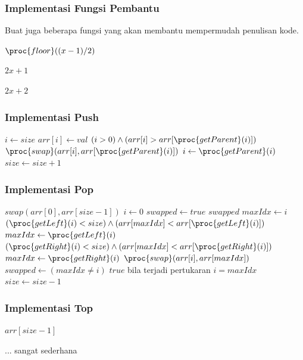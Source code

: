 \begin{frame}
\frametitle{Implementasi Fungsi Pembantu}
Buat juga beberapa fungsi yang akan membantu mempermudah penulisan kode.
\begin{codebox}
\li \Return $\proc{floor}((x-1) / 2)$
\end{codebox}

\begin{codebox}
\li \Return $2x + 1$
\end{codebox}

\begin{codebox}
\li \Return $2x + 2$
\end{codebox}
\end{frame}

\begin{frame}
\frametitle{Implementasi Push}
\begin{codebox}
\li $i \gets size$
\li $arr[i] \gets val$
\li \While $(i > 0) \land (arr[i] > arr[\proc{getParent}(i)])$  \Do
\li   $\proc{swap}(arr[i], arr[\proc{getParent}(i)])$
\li   $i \gets \proc{getParent}(i)$
    \End
\li $size \gets size + 1$
\end{codebox}
\end{frame}

\begin{frame}
\frametitle{Implementasi Pop}
\begin{codebox}
\li $swap(arr[0], arr[size-1])$
\li $i \gets 0$
\li $swapped \gets true$
\li \While $swapped$  \Do
\li   $maxIdx \gets i$
\li   \If $(\proc{getLeft}(i) < size) \land (arr[maxIdx] < arr[\proc{getLeft}(i)])$ \Then
\li     $maxIdx \gets \proc{getLeft}(i)$
      \End
\li   \If $(\proc{getRight}(i) < size) \land (arr[maxIdx] < arr[\proc{getRight}(i)])$ \Then
\li     $maxIdx \gets \proc{getRight}(i)$
      \End
\li   $\proc{swap}(arr[i], arr[maxIdx])$
\li   $swapped \gets (maxIdx \ne i)$ 
\Comment $true$ bila terjadi pertukaran
\li   $i = maxIdx$
    \End
\li $size \gets size - 1$
\end{codebox}
\end{frame}

\begin{frame}
\frametitle{Implementasi Top}
\begin{codebox}
\li \Return $arr[size-1]$
\end{codebox}

... sangat sederhana
\end{frame}

